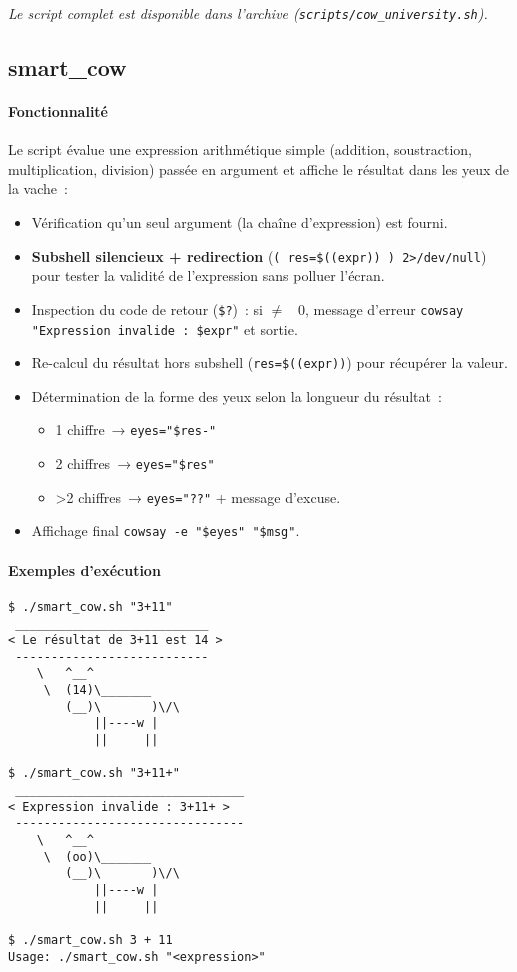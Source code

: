 \documentclass[a4paper,french,11pt]{article}
\begin{document}
\medskip
\noindent\emph{Le script complet est disponible dans l’archive (\texttt{scripts/cow\_university.sh}).}

\newpage

\subsection{smart\_cow}

\paragraph{Fonctionnalité}  
Le script évalue une expression arithmétique simple (addition, soustraction, multiplication, division) passée en argument et affiche le résultat dans les yeux de la vache :
\begin{itemize}
  \item Vérification qu’un seul argument (la chaîne d’expression) est fourni.  
  \item \textbf{Subshell silencieux + redirection} (\texttt{( res=\$((expr)) ) 2>/dev/null}) pour tester la validité de l’expression sans polluer l’écran.  
  \item Inspection du code de retour (\texttt{\$?}) : si $\ne$  0, message d’erreur \texttt{cowsay "Expression invalide : \$expr"} et sortie.  
  \item Re-calcul du résultat hors subshell (\texttt{res=\$((expr))}) pour récupérer la valeur.  
  \item Détermination de la forme des yeux selon la longueur du résultat :  
    \begin{itemize}
      \item 1 chiffre → \texttt{eyes="\${res}-"}  
      \item 2 chiffres → \texttt{eyes="\$res"}  
      \item >2 chiffres → \texttt{eyes="??"} + message d’excuse.  
    \end{itemize}
  \item Affichage final \texttt{cowsay -e "\$eyes" "\$msg"}.
\end{itemize}

\paragraph{Exemples d’exécution}
\begin{verbatim}
$ ./smart_cow.sh "3+11"
 ___________________________
< Le résultat de 3+11 est 14 >
 ---------------------------
    \   ^__^
     \  (14)\_______
        (__)\       )\/\
            ||----w |
            ||     ||

$ ./smart_cow.sh "3+11+"
 ________________________________
< Expression invalide : 3+11+ >
 --------------------------------
    \   ^__^
     \  (oo)\_______
        (__)\       )\/\
            ||----w |
            ||     ||

$ ./smart_cow.sh 3 + 11
Usage: ./smart_cow.sh "<expression>"
\end{verbatim}
\end{document}
